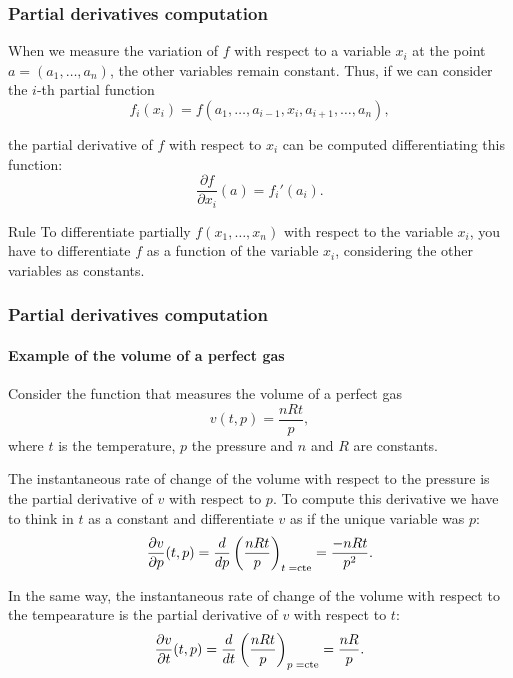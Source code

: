 \begin{frame}
\frametitle{Partial derivatives computation}
When we measure the variation of $f$ with respect to a variable $x_i$ at the point $a=(a_1,\ldots,a_n)$, the other variables remain constant. 
Thus, if we can consider the $i$-th partial function 
\[
f_i(x_i)=f(a_1,\ldots,a_{i-1},x_i,a_{i+1},\ldots,a_n),
\]

the partial derivative of $f$ with respect to $x_i$ can be computed differentiating this function:
\[
\frac{\partial f}{\partial x_i}(a)=f_i'(a_i).
\]

\begin{block}{Rule}
To differentiate partially $f(x_1,\ldots,x_n)$ with respect to the variable $x_i$, you have to differentiate $f$ as a function  of the variable $x_i$, considering the other variables as constants.
\end{block}
\end{frame}


\begin{frame}
\frametitle{Partial derivatives computation}
\framesubtitle{Example of the volume of a perfect gas}
Consider the function that measures the volume of a perfect gas
\[v(t,p)=\frac{nRt}{p},\]
where $t$ is the temperature, $p$ the pressure and $n$ and $R$ are constants.

The instantaneous rate of change of the volume with respect to the pressure is the partial derivative of $v$ with respect to $p$.
To compute this derivative we have to think in $t$ as a constant and differentiate $v$ as if the unique variable was $p$:
\[
\frac{\partial v}{\partial p}(t,p)=\frac{d}{dp}\left(\frac{nRt}{p}\right)_{\mbox{\scriptsize $t=$cte}}=\frac{-nRt}{p^2}.
\]

In the same way, the instantaneous rate of change of the volume with respect to the tempearature is the partial derivative of $v$ with respect to $t$:
\[
\frac{\partial v}{\partial t}(t,p)=\frac{d}{dt}\left(\frac{nRt}{p}\right)_{\mbox{\scriptsize$p=$cte}}=\frac{nR}{p}.
\]
\end{frame}



